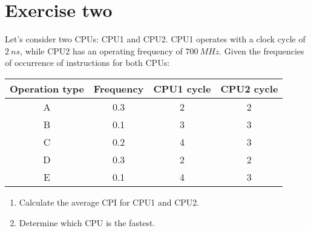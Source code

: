 \section{Exercise two}

Let's consider two CPUs: CPU1 and CPU2.
CPU1 operates with a clock cycle of $2\:ns$, while CPU2 has an operating frequency of $700\:MHz$.
Given the frequencies of occurrence of instructions for both CPUs:
\begin{table}[H]
    \centering
    \begin{tabular}{cccc}
    \hline
    \textbf{Operation type} & \textbf{Frequency} & \textbf{CPU1 cycle} & \textbf{CPU2 cycle} \\ \hline
    A                       & 0.3                & 2                   & 2                   \\
    B                       & 0.1                & 3                   & 3                   \\
    C                       & 0.2                & 4                   & 3                   \\
    D                       & 0.3                & 2                   & 2                   \\
    E                       & 0.1                & 4                   & 3                   \\ \hline
    \end{tabular}
\end{table}
\begin{enumerate}
    \item Calculate the average CPI for CPU1 and CPU2.
    \item Determine which CPU is the fastest.
\end{enumerate}

